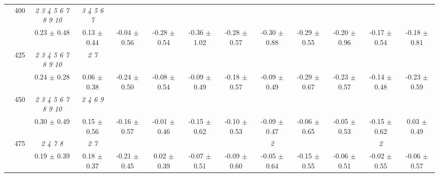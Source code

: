 \begin{table}[h]
{\begin{tabular}{
        ccccccccccccc}
 & \multirow{2}{*}{400}& \textit{  2  3  4  5  6  7  8  9 10 }& \textit{ 3 4 5 6 7 }& & & & & & & & &  \\ 
 & & 0.23 $\pm$ 0.48& 0.13 $\pm$ 0.44& -0.04 $\pm$ 0.56& -0.28 $\pm$ 0.54& -0.36 $\pm$ 1.02& -0.28 $\pm$ 0.57& -0.30 $\pm$ 0.88& -0.29 $\pm$ 0.55& -0.20 $\pm$ 0.96& -0.17 $\pm$ 0.54& -0.18 $\pm$ 0.81 \\ 
 & \multirow{2}{*}{425}& \cellcolor[HTML]{EFEFEF} \textit{  2  3  4  5  6  7  8  9 10 }& \cellcolor[HTML]{EFEFEF} \textit{ 2 7 }& \cellcolor[HTML]{EFEFEF} & \cellcolor[HTML]{EFEFEF} & \cellcolor[HTML]{EFEFEF} & \cellcolor[HTML]{EFEFEF} & \cellcolor[HTML]{EFEFEF} & \cellcolor[HTML]{EFEFEF} & \cellcolor[HTML]{EFEFEF} & \cellcolor[HTML]{EFEFEF} & \cellcolor[HTML]{EFEFEF}  \\ 
 & & \cellcolor[HTML]{EFEFEF} 0.24 $\pm$ 0.28& \cellcolor[HTML]{EFEFEF} 0.06 $\pm$ 0.38& \cellcolor[HTML]{EFEFEF} -0.24 $\pm$ 0.50& \cellcolor[HTML]{EFEFEF} -0.08 $\pm$ 0.54& \cellcolor[HTML]{EFEFEF} -0.09 $\pm$ 0.49& \cellcolor[HTML]{EFEFEF} -0.18 $\pm$ 0.57& \cellcolor[HTML]{EFEFEF} -0.09 $\pm$ 0.49& \cellcolor[HTML]{EFEFEF} -0.29 $\pm$ 0.67& \cellcolor[HTML]{EFEFEF} -0.23 $\pm$ 0.57& \cellcolor[HTML]{EFEFEF} -0.14 $\pm$ 0.48& \cellcolor[HTML]{EFEFEF} -0.23 $\pm$ 0.59 \\ 
 & \multirow{2}{*}{450}& \textit{  2  3  4  5  6  7  8  9 10 }& \textit{ 2 4 6 9 }& & & & & & & & &  \\ 
 & & 0.30 $\pm$ 0.49& 0.15 $\pm$ 0.56& -0.16 $\pm$ 0.57& -0.01 $\pm$ 0.46& -0.15 $\pm$ 0.62& -0.10 $\pm$ 0.53& -0.09 $\pm$ 0.47& -0.06 $\pm$ 0.65& -0.05 $\pm$ 0.53& -0.15 $\pm$ 0.62& 0.03 $\pm$ 0.49 \\ 
 & \multirow{2}{*}{475}& \cellcolor[HTML]{EFEFEF} \textit{ 2 4 7 8 }& \cellcolor[HTML]{EFEFEF} \textit{ 2 7 }& \cellcolor[HTML]{EFEFEF} & \cellcolor[HTML]{EFEFEF} & \cellcolor[HTML]{EFEFEF} & \cellcolor[HTML]{EFEFEF} & \cellcolor[HTML]{EFEFEF} \textit{ 2 }& \cellcolor[HTML]{EFEFEF} & \cellcolor[HTML]{EFEFEF} & \cellcolor[HTML]{EFEFEF} \textit{ 2 }& \cellcolor[HTML]{EFEFEF}  \\ 
 & & \cellcolor[HTML]{EFEFEF} 0.19 $\pm$ 0.39& \cellcolor[HTML]{EFEFEF} 0.18 $\pm$ 0.37& \cellcolor[HTML]{EFEFEF} -0.21 $\pm$ 0.45& \cellcolor[HTML]{EFEFEF} 0.02 $\pm$ 0.39& \cellcolor[HTML]{EFEFEF} -0.07 $\pm$ 0.51& \cellcolor[HTML]{EFEFEF} -0.09 $\pm$ 0.60& \cellcolor[HTML]{EFEFEF} -0.05 $\pm$ 0.64& \cellcolor[HTML]{EFEFEF} -0.15 $\pm$ 0.55& \cellcolor[HTML]{EFEFEF} -0.06 $\pm$ 0.51& \cellcolor[HTML]{EFEFEF} -0.02 $\pm$ 0.55& \cellcolor[HTML]{EFEFEF} -0.06 $\pm$ 0.57 \\ 

\end{tabular}}
\end{table}
